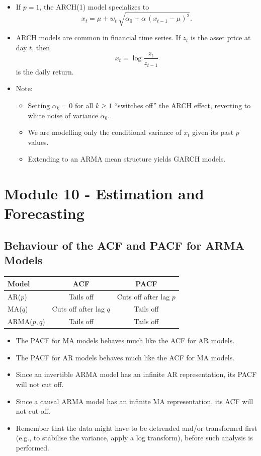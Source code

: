 \documentclass[11pt]{article}
\begin{document}
\begin{itemize}
  \item If \(p=1\), the ARCH(1) model specializes to
    \[
      x_t = \mu + w_t \,\sqrt{\alpha_0 + \alpha\,(x_{t-1}-\mu)^2}.
    \]
  \item ARCH models are common in financial time series.  If \(z_t\) is the asset price at day \(t\), then
    \[
      x_t = \log\frac{z_t}{z_{t-1}}
    \]
    is the daily return.
  \item Note:
    \begin{itemize}
      \item Setting \(\alpha_k=0\) for all \(k\ge1\) “switches off” the ARCH effect, reverting to white noise of variance \(\alpha_0\).
      \item We are modelling only the conditional variance of \(x_t\) given its past \(p\) values.
      \item Extending to an ARMA mean structure yields GARCH models.
    \end{itemize}
\end{itemize}


\newpage
\section{Module 10 - Estimation and Forecasting}
\subsection{Behaviour of the ACF and PACF for ARMA Models}
\begin{table}[ht]
\centering
\begin{tabular}{lcc}
\toprule
Model & ACF & PACF \\
\midrule
AR($p$) & Tails off & Cuts off after lag $p$ \\
MA($q$) & Cuts off after lag $q$ & Tails off \\
ARMA($p, q$) & Tails off & Tails off \\
\bottomrule
\end{tabular}
\end{table}

\begin{itemize}[leftmargin=*]
  \item The PACF for MA models behaves much like the ACF for AR models.
  \item The PACF for AR models behaves much like the ACF for MA models.
  \item Since an invertible ARMA model has an infinite AR representation, its PACF will not cut off.
  \item Since a causal ARMA model has an infinite MA representation, its ACF will not cut off.
  \item Remember that the data might have to be detrended and/or transformed first (e.g., to stabilise the variance, apply a log transform), before such analysis is performed.
\end{itemize}
\end{document}
